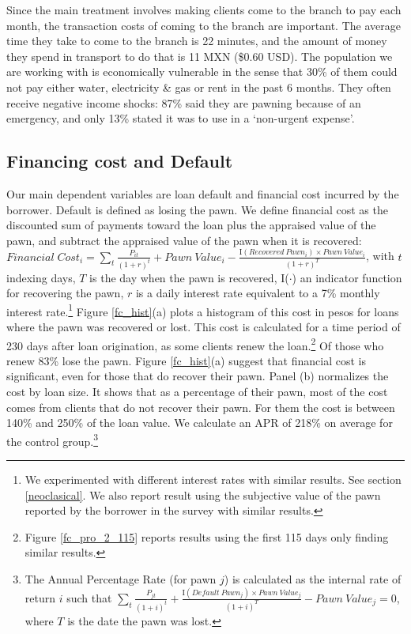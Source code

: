 \documentclass[oneside,11pt]{article}
\begin{document}
Since the main treatment involves making clients come to the branch to pay each month, the transaction costs of coming to the branch are important. The average time they take to come to the branch is 22 minutes, and the amount of money they spend in transport to do that is 11 MXN (\$0.60 USD).  
The population we are working with is economically vulnerable in the sense that 30\% of them could not pay either water, electricity \& gas or rent in the past 6 months. They often receive negative income shocks: 87\% said they are pawning because of an emergency, and only 13\% stated it was to use in a `non-urgent expense'.


\subsection{Financing cost and Default} \label{FC_def}

Our main dependent variables are loan default and financial cost incurred by the borrower. Default is defined as losing the pawn. We define financial cost as the discounted sum of payments toward the loan plus the appraised value of the pawn, and subtract the appraised value of the pawn when it is recovered: $Financial \; Cost_i = \sum_t \frac{P_{it}}{(1+r)^t} + Pawn \: Value_i - \frac{\text{I}(Recovered \: Pawn_i) \times Pawn \: Value_i}{(1+r)^T}$, with $t$ indexing days, $T$ is the day when the pawn is recovered, I($\cdot$) an indicator function for recovering the pawn, $r$ is a daily interest rate equivalent to a 7\% monthly interest rate.\footnote{We experimented with different interest rates with similar results. See section \ref{neoclasical}. We also report result using the subjective value of the pawn reported by the borrower in the survey with similar results.} Figure \ref{fc_hist}(a) plots a histogram of this cost in pesos for loans where the pawn was recovered or lost. This cost is calculated for a time period of 230 days after loan origination, as %
some clients renew the loan.\footnote{Figure \ref{fc_pro_2_115} reports results using the first 115 days only finding similar results.} Of those who renew 83\% lose the pawn. Figure \ref{fc_hist}(a) suggest that financial cost is significant, even for those that do recover their pawn. Panel (b) normalizes the cost by loan size. It shows that as a percentage of their pawn, most of the cost comes from clients that do not recover their pawn. For them the cost is between 140\% and 250\% of the loan value. %
We calculate an APR of 218\% on average for the control group.\footnote{The Annual Percentage Rate (for pawn $j$) is calculated as the internal rate of return $i$ such that $\sum_t \frac{P_{jt}}{(1+i)^t} + \frac{\text{I}(Default \: Pawn_j) \times Pawn \: Value_j}{(1+i)^T} - Pawn \: Value_j = 0$, where $T$ is the date the pawn was lost.}
\end{document}
